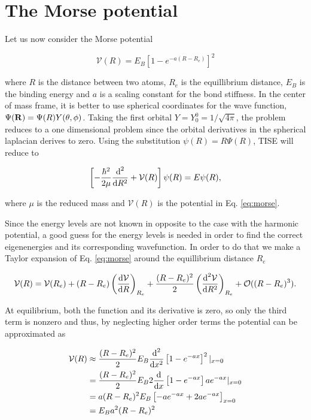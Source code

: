 \section{The Morse potential}

Let us now consider the Morse potential

\begin{equation}
  \label{eq:morse}
  \mathcal V(R) = E_B \left[ 1-e^{-a(R-R_e)} \right]^2
\end{equation}

where $R$ is the distance between two atoms, $R_e$ is the equillibrium distance, $E_B$ is the binding energy and $a$ is a scaling constant for the bond stiffness. In the center of mass frame, it is better to use spherical coordinates for the wave function, $\Psi(\mathbf{R}) = \Psi(R)Y(\theta,\phi)$. Taking the first orbital $Y = Y_0^0 = 1/\sqrt{4\pi}$, the problem reduces to a one dimensional problem since the orbital derivatives in the spherical laplacian derives to zero. Using the substitution $\psi (R) = R\Psi(R)$, TISE will reduce to

\begin{equation}
  \label{eq:spherTISE}
  \left[ -\frac{\hbar^2}{2\mu} \frac{\textnormal{d}^2}{\textnormal{d} R^2} + \mathcal V(R) \right]\psi(R) = E\psi(R),
\end{equation}

where $\mu$ is the reduced mass and $\mathcal V(R)$ is the potential in Eq. \eqref{eq:morse}.

Since the energy levels are not known in opposite to the case with the harmonic potential, a good guess for the energy levels is needed in order to find the correct eigenenergies and its corresponding wavefunction. In order to do that we make a Taylor expansion of Eq. \eqref{eq:morse} around the equillibrium distance $R_e$

\begin{equation}
  \label{eq:taylor}
  \mathcal V(R) = \mathcal V(R_e) + (R-R_e)\left(\frac{\textnormal{d} \mathcal V}{\textnormal{d} R}\right)_{R_e} + \frac{(R-R_e)^2}{2}\left(\frac{\textnormal{d}^2 \mathcal V}{\textnormal{d} R^2}\right)_{R_e} + \mathcal O((R-R_e)^3).
\end{equation}

At equilibrium, both the function and its derivative is zero, so only the third term is nonzero and thus, by neglecting higher order terms the potential can be approximated as

\begin{equation}
  \label{eq:morseApprox}
  \begin{split}
  \mathcal V(R) &\approx \frac{(R-R_e)^2}{2} E_B \frac{\textnormal{d}^2}{\textnormal{d} x^2} \left[ 1-e^{-ax} \right]^2|_{x=0} \\
   & = \frac{(R-R_e)^2}{2} E_B 2 \frac{\textnormal{d}}{\textnormal{d} x} \left[1-e^{-ax}\right] a e^{-ax} |_{x=0}\\
   & = a(R-R_e)^2 E_B \left[ -a e^{-ax} +2a e^{-ax} \right]_{x=0} \\
   & = E_B a^2 (R-R_e)^2
  \end{split}
\end{equation}

